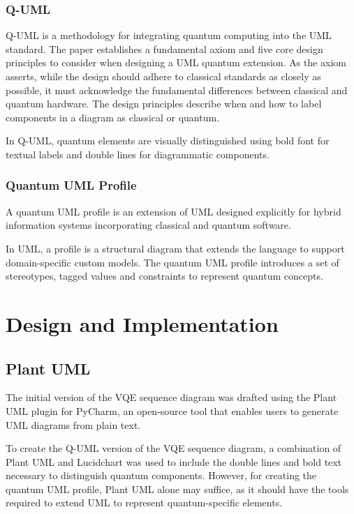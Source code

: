\documentclass{article}
\begin{document}
{\subsubsection{Q-UML}

Q-UML is a methodology for integrating quantum computing into the UML standard. The paper establishes a fundamental axiom and five core design principles to consider when designing a UML quantum extension. As the axiom asserts, while the design should adhere to classical standards as closely as possible, it must acknowledge the fundamental differences between classical and quantum hardware. The design principles describe when and how to label components in a diagram as classical or quantum.

In Q-UML, quantum elements are visually distinguished using bold font for textual labels and double lines for diagrammatic components. 

\subsubsection{Quantum UML Profile}

A quantum UML profile is an extension of UML designed explicitly for hybrid information systems incorporating classical and quantum software.

In UML, a profile is a structural diagram that extends the language to support domain-specific custom models. The quantum UML profile introduces a set of stereotypes, tagged values and constraints to represent quantum concepts. 

\section{Design and Implementation}
\subsection{Plant UML}

The initial version of the VQE sequence diagram was drafted using the Plant UML plugin for PyCharm, an open-source tool that enables users to generate UML diagrams from plain text.

To create the Q-UML version of the VQE sequence diagram, a combination of Plant UML and Lucidchart was used to include the double lines and bold text necessary to distinguish quantum components. However, for creating the quantum UML profile, Plant UML alone may suffice, as it should have the tools required to extend UML to represent quantum-specific elements. 

}
\end{document}
